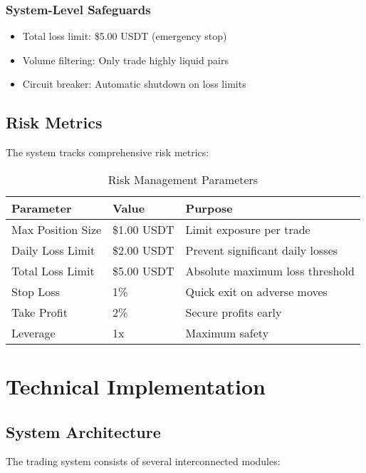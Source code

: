 \documentclass[12pt,a4paper]{article}
\begin{document}
\subsubsection{System-Level Safeguards}
\begin{itemize}
\item Total loss limit: \$5.00 USDT (emergency stop)
\item Volume filtering: Only trade highly liquid pairs
\item Circuit breaker: Automatic shutdown on loss limits
\end{itemize}

\subsection{Risk Metrics}
The system tracks comprehensive risk metrics:

\begin{table}[H]
\centering
\caption{Risk Management Parameters}
\begin{tabular}{@{}lll@{}}
\toprule
Parameter & Value & Purpose \\
\midrule
Max Position Size & \$1.00 USDT & Limit exposure per trade \\
Daily Loss Limit & \$2.00 USDT & Prevent significant daily losses \\
Total Loss Limit & \$5.00 USDT & Absolute maximum loss threshold \\
Stop Loss & 1\% & Quick exit on adverse moves \\
Take Profit & 2\% & Secure profits early \\
Leverage & 1x & Maximum safety \\
\bottomrule
\end{tabular}
\end{table}

\section{Technical Implementation}

\subsection{System Architecture}
The trading system consists of several interconnected modules:
\end{document}
